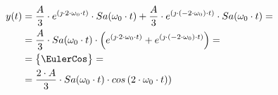 \begin{task}
\begin{align*}
y(t) &= \frac{A}{3} \cdot e^{(\jmath \cdot 2 \cdot \omega_0 \cdot t)} \cdot Sa(\omega_0 \cdot t) + \frac{A}{3} \cdot e^{(\jmath \cdot (-2 \cdot \omega_0) \cdot t)} \cdot Sa(\omega_0 \cdot t)=\\
&= \frac{A}{3} \cdot Sa(\omega_0 \cdot t) \cdot \left(e^{(\jmath \cdot 2 \cdot \omega_0 \cdot t)} + e^{(\jmath \cdot (-2 \cdot \omega_0) \cdot t)} \right)=\\
&=\begin{Bmatrix}
\EulerCos
\end{Bmatrix}=\\
&= \frac{2 \cdot A}{3} \cdot Sa(\omega_0 \cdot t) \cdot cos\left(2 \cdot \omega_0 \cdot t)\right)
\end{align*}



\end{task}

